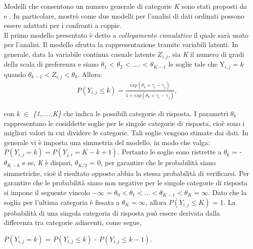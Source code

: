 Modelli che consentono un numero generale di categorie \emph{K} sono stati proposti da \textcite{bradley1952rank} e \textcite{tutz1986bradley}. In particolare, \textcite{tutz1986bradley} mostrò come due modelli per l'analisi di dati ordinati possono essere adattati per i confronti a coppie.\\

Il primo modello presentato è detto a \emph{collegamento cumulativo} il quale sarà usato per l'analisi. Il modello sfrutta la rappresentazione tramite variabili latenti. In generale, data la variabile continua casuale latente $Z_{i,j}$, sia \emph{K} il numero di gradi della scala di preferenza e siano $\theta_{1} $ < $\theta_{2}$ < .... < $\theta_{K-1}$ le soglie tale che Y$_{i,j} = k$ quando $\theta_{k-1} < Z_{i,j} < \theta_{k}$. Allora:
\begin{align}
	P(Y_{i,j}\leq k) =  \frac{exp(\theta_{k} + \gamma_{i} - \gamma_{j})}{1 + exp(\theta_{k} + \gamma_{i} - \gamma_{j})} \label{for:3.2.1},
\end{align}

con \emph{k $\in$ \{1,....,K\}} che indica le possibili categorie di risposta. I parametri $\theta_{k}$ rappresentano le cosiddette soglie per le singole categorie di risposta, cioè sono i migliori valori in cui dividere le categorie. Tali soglie vengono stimate dai dati. %
In generale vi è imposta una simmetria del modello, in modo che valga: $P(Y_{i,j} = k) = P(Y_{j,i} = K - k + 1)$. Pertanto le soglie sono ristrette a $\theta_{k}$ = -$\theta_{K-k}$ e se, \emph{K} è dispari, $\theta_{K/2}$ = 0, per garantire che le probabilità siano simmetriche, cioè il risultato opposto abbia la stessa probabilità di verificarsi. Per garantire che le probabilità siano non negative per le singole categorie di risposta si impone il seguente vincolo $-\infty$ = $\theta_{0} < \theta_{1} < ... < \theta_{K-1} < \theta_{K} = \infty$. Dato che la soglia per l'ultima categoria è fissata a $\theta_{K} = \infty$, allora $P(Y_{i,j} \leq K)$ = 1. La probabilità di una singola categoria di risposta può essere derivata dalla differenza tra categorie adiacenti, come segue,
\begin{center}
	  $P(Y_{i,j} = k)$ = $P(Y_{i,j} \leq k)$ - $P(Y_{i,j} \leq k - 1)$.
\end{center}

